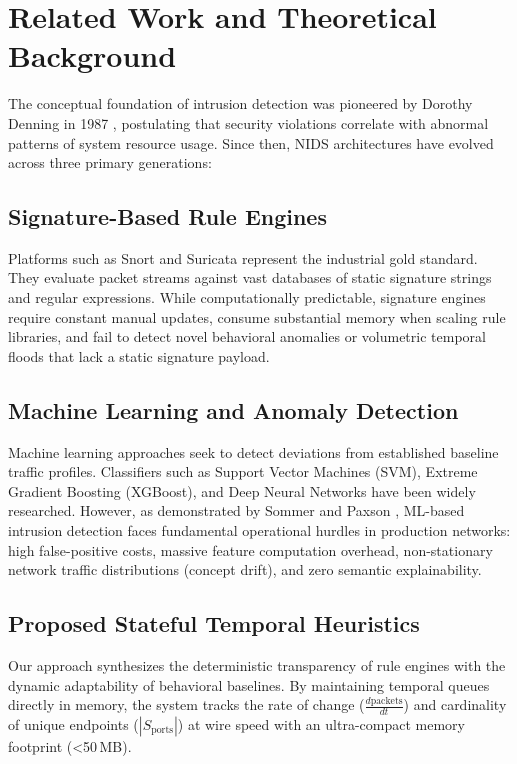 \documentclass[conference]{IEEEtran}
\begin{document}
\section{Related Work and Theoretical Background}
The conceptual foundation of intrusion detection was pioneered by Dorothy Denning in 1987 \cite{denning1987intrusion}, postulating that security violations correlate with abnormal patterns of system resource usage. Since then, NIDS architectures have evolved across three primary generations:

\subsection{Signature-Based Rule Engines}
Platforms such as Snort \cite{roesch1999snort} and Suricata represent the industrial gold standard. They evaluate packet streams against vast databases of static signature strings and regular expressions. While computationally predictable, signature engines require constant manual updates, consume substantial memory when scaling rule libraries, and fail to detect novel behavioral anomalies or volumetric temporal floods that lack a static signature payload.

\subsection{Machine Learning and Anomaly Detection}
Machine learning approaches seek to detect deviations from established baseline traffic profiles. Classifiers such as Support Vector Machines (SVM), Extreme Gradient Boosting (XGBoost), and Deep Neural Networks have been widely researched. However, as demonstrated by Sommer and Paxson \cite{sommer2010outside}, ML-based intrusion detection faces fundamental operational hurdles in production networks: high false-positive costs, massive feature computation overhead, non-stationary network traffic distributions (concept drift), and zero semantic explainability.

\subsection{Proposed Stateful Temporal Heuristics}
Our approach synthesizes the deterministic transparency of rule engines with the dynamic adaptability of behavioral baselines. By maintaining temporal queues directly in memory, the system tracks the rate of change ($\frac{d\text{packets}}{dt}$) and cardinality of unique endpoints ($|S_{\text{ports}}|$) at wire speed with an ultra-compact memory footprint (<50\,MB).
\end{document}
